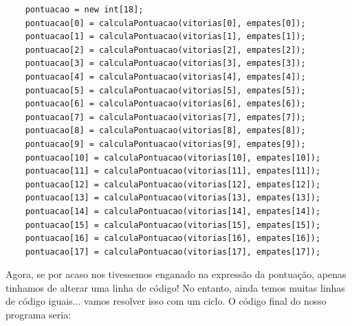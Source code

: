 \begin{lstlisting}
    pontuacao = new int[18];
    pontuacao[0] = calculaPontuacao(vitorias[0], empates[0]);
    pontuacao[1] = calculaPontuacao(vitorias[1], empates[1]);
    pontuacao[2] = calculaPontuacao(vitorias[2], empates[2]);
    pontuacao[3] = calculaPontuacao(vitorias[3], empates[3]);
    pontuacao[4] = calculaPontuacao(vitorias[4], empates[4]);
    pontuacao[5] = calculaPontuacao(vitorias[5], empates[5]);                
    pontuacao[6] = calculaPontuacao(vitorias[6], empates[6]);
    pontuacao[7] = calculaPontuacao(vitorias[7], empates[7]);
    pontuacao[8] = calculaPontuacao(vitorias[8], empates[8]);
    pontuacao[9] = calculaPontuacao(vitorias[9], empates[9]);
    pontuacao[10] = calculaPontuacao(vitorias[10], empates[10]);
    pontuacao[11] = calculaPontuacao(vitorias[11], empates[11]);                        
    pontuacao[12] = calculaPontuacao(vitorias[12], empates[12]);                        
    pontuacao[13] = calculaPontuacao(vitorias[13], empates[13]);                        
    pontuacao[14] = calculaPontuacao(vitorias[14], empates[14]);                        
    pontuacao[15] = calculaPontuacao(vitorias[15], empates[15]);                        
    pontuacao[16] = calculaPontuacao(vitorias[16], empates[16]);                       
    pontuacao[17] = calculaPontuacao(vitorias[17], empates[17]);
\end{lstlisting}
Agora, se por acaso nos tivessemos enganado na expressão da pontuação, apenas tinhamos de alterar uma linha de código!
No entanto, ainda temos muitas linhas de código iguais... vamos resolver isso com um ciclo. O código final do nosso programa seria:
